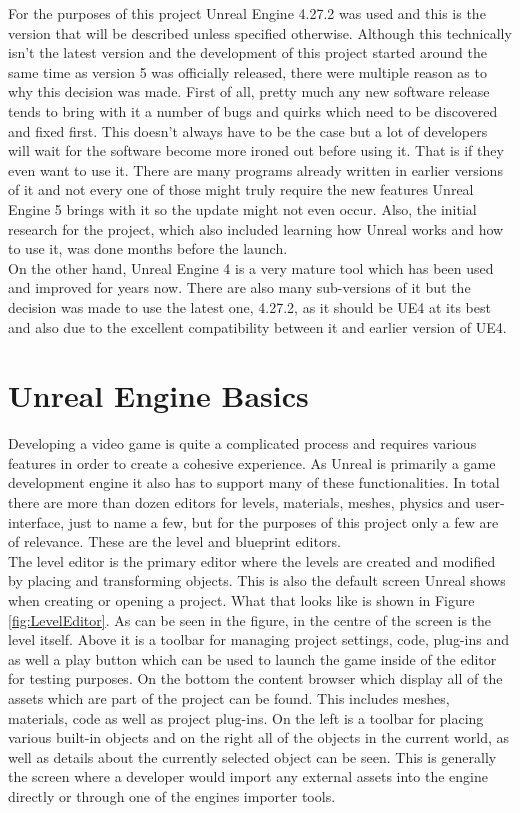 For the purposes of this project Unreal Engine 4.27.2 was used and this is the version that will be described unless specified otherwise. Although this technically isn't the latest version and the development of this project started around the same time as version 5 was officially released, there were multiple reason as to why this decision was made. First of all, pretty much any new software release tends to bring with it a number of bugs and quirks which need to be discovered and fixed first. This doesn't always have to be the case but a lot of developers will wait for the software become more ironed out before using it. That is if they even want to use it. There are many programs already written in earlier versions of it and not every one of those might truly require the new features Unreal Engine 5 brings with it so the update might not even occur. Also, the initial research for the project, which also included learning how Unreal works and how to use it, was done months before the launch.\\ 
On the other hand, Unreal Engine 4 is a very mature tool which has been used and improved for years now. There are also many sub-versions of it but the decision was made to use the latest one, 4.27.2, as it should be UE4 at its best and also due to the excellent compatibility between it and earlier version of UE4.

\section{Unreal Engine Basics}\label{sec:Grundlage1}
Developing a video game is quite a complicated process and requires various features in order to create a cohesive experience. As Unreal is primarily a game development engine it also has to support many of these functionalities. In total there are more than dozen editors for levels, materials, meshes, physics and user-interface\cite{bib:UEEditors}, just to name a few, but for the purposes of this project only a few are of relevance. These are the level and blueprint editors.\\

The level editor is the primary editor where the levels are created and modified by placing and transforming objects. This is also the default screen Unreal shows when creating or opening a project. What that looks like is shown in Figure \ref{fig:LevelEditor}. As can be seen in the figure, in the centre of the screen is the level itself. Above it is a toolbar for managing project settings, code, plug-ins and as well a play button which can be used to launch the game inside of the editor for testing purposes. On the bottom the content browser which display all of the assets which are part of the project can be found. This includes meshes, materials, code as well as project plug-ins. On the left is a toolbar for placing various built-in objects and on the right all of the objects in the current world, as well as details about the currently selected object can be seen. This is generally the screen where a developer would import any external assets into the engine directly or through one of the engines importer tools.\\

